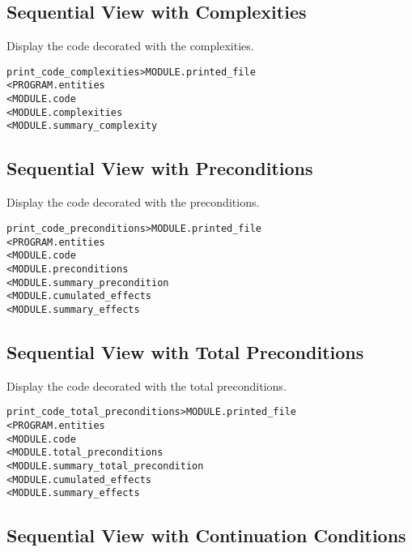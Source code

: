 \documentclass[a4paper]{report}
\newenvironment{PipsMake}{\begin{alltt}}{\end{alltt}}
\newenvironment{PipsPass}[1]{\label{pass:#1}}{}
\begin{document}
\subsection{Sequential View with Complexities}

\begin{PipsPass}{print_code_complexities}
Display the code decorated with the complexities.
\end{PipsPass}

\begin{PipsMake}
print_code_complexities         > MODULE.printed_file
        < PROGRAM.entities
        < MODULE.code
        < MODULE.complexities
        < MODULE.summary_complexity
\end{PipsMake}

\subsection{Sequential View with Preconditions}

\begin{PipsPass}{print_code_preconditions}
Display the code decorated with the preconditions.
\end{PipsPass}

\begin{PipsMake}
print_code_preconditions        > MODULE.printed_file
        < PROGRAM.entities
        < MODULE.code
        < MODULE.preconditions
        < MODULE.summary_precondition
        < MODULE.cumulated_effects
        < MODULE.summary_effects
\end{PipsMake}

\subsection{Sequential View with Total Preconditions}

\begin{PipsPass}{print_code_total_preconditions}
Display the code decorated with the total preconditions.
\end{PipsPass}

\begin{PipsMake}
print_code_total_preconditions        > MODULE.printed_file
        < PROGRAM.entities
        < MODULE.code
        < MODULE.total_preconditions
        < MODULE.summary_total_precondition
        < MODULE.cumulated_effects
        < MODULE.summary_effects
\end{PipsMake}

\subsection{Sequential View with Continuation Conditions}
\end{document}
